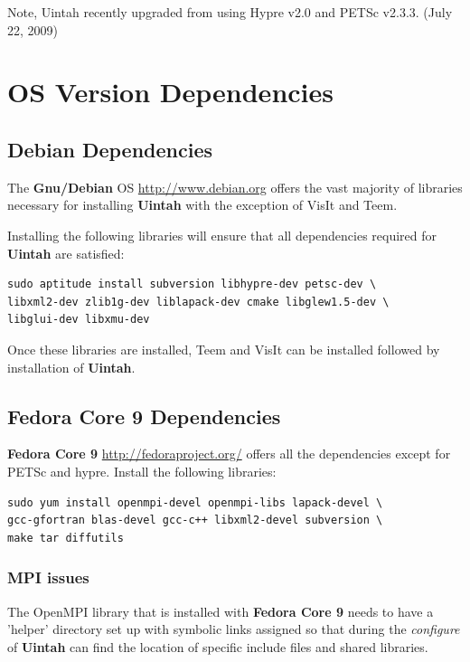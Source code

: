\documentclass[12pt]{article}
\begin{document}
Note, Uintah recently upgraded from using Hypre v2.0 and PETSc
v2.3.3.  (July 22, 2009)

\section{OS Version Dependencies}

\subsection{Debian Dependencies}
\label{sec:debian_dependencies}
The \textbf{Gnu/Debian} OS \url{http://www.debian.org} offers the vast majority of libraries necessary for
installing \textbf{Uintah} with the exception of VisIt and Teem.

Installing the following libraries will ensure that all dependencies
required for \textbf{Uintah} are satisfied: 

\begin{verbatim} 
sudo aptitude install subversion libhypre-dev petsc-dev \ 
libxml2-dev zlib1g-dev liblapack-dev cmake libglew1.5-dev \
libglui-dev libxmu-dev
\end{verbatim}

Once these libraries are installed, Teem and VisIt can be installed
followed by installation of \textbf{Uintah}.

\subsection{Fedora Core 9 Dependencies}

\textbf{Fedora Core 9} \url{http://fedoraproject.org/} offers all the
dependencies except for PETSc and hypre.  Install the following
libraries:
\begin{verbatim}
sudo yum install openmpi-devel openmpi-libs lapack-devel \
gcc-gfortran blas-devel gcc-c++ libxml2-devel subversion \ 
make tar diffutils
\end{verbatim}

\subsubsection{MPI issues} 
\label{sec:mpi}

The OpenMPI library that is installed with \textbf{Fedora Core 9}
needs to have a 'helper' directory set up with symbolic links assigned
so that during the \emph{configure} of \textbf{Uintah} can find the
location of specific include files and shared libraries.
\end{document}
